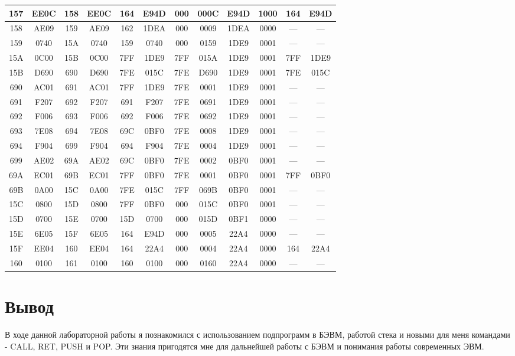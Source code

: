\begin{center}
\begin{tabular}{|c|c|c|c|c|c|c|c|c|c|c|c|}
\hline
157 & EE0C & 158 & EE0C & 164 & E94D & 000 & 000C & E94D & 1000 & 164 & E94D\\
\hline
158 & AE09 & 159 & AE09 & 162 & 1DEA & 000 & 0009 & 1DEA & 0000 & --- & ---\\
\hline
159 & 0740 & 15A & 0740 & 159 & 0740 & 000 & 0159 & 1DE9 & 0001 & --- & ---\\
\hline
15A & 0C00 & 15B & 0C00 & 7FF & 1DE9 & 7FF & 015A & 1DE9 & 0001 & 7FF & 1DE9\\
\hline
15B & D690 & 690 & D690 & 7FE & 015C & 7FE & D690 & 1DE9 & 0001 & 7FE & 015C\\
\hline
690 & AC01 & 691 & AC01 & 7FF & 1DE9 & 7FE & 0001 & 1DE9 & 0001 & --- & ---\\
\hline
691 & F207 & 692 & F207 & 691 & F207 & 7FE & 0691 & 1DE9 & 0001 & --- & ---\\
\hline
692 & F006 & 693 & F006 & 692 & F006 & 7FE & 0692 & 1DE9 & 0001 & --- & ---\\
\hline
693 & 7E08 & 694 & 7E08 & 69C & 0BF0 & 7FE & 0008 & 1DE9 & 0001 & --- & ---\\
\hline
694 & F904 & 699 & F904 & 694 & F904 & 7FE & 0004 & 1DE9 & 0001 & --- & ---\\
\hline
699 & AE02 & 69A & AE02 & 69C & 0BF0 & 7FE & 0002 & 0BF0 & 0001 & --- & ---\\
\hline
69A & EC01 & 69B & EC01 & 7FF & 0BF0 & 7FE & 0001 & 0BF0 & 0001 & 7FF & 0BF0\\
\hline
69B & 0A00 & 15C & 0A00 & 7FE & 015C & 7FF & 069B & 0BF0 & 0001 & --- & ---\\
\hline
15C & 0800 & 15D & 0800 & 7FF & 0BF0 & 000 & 015C & 0BF0 & 0001 & --- & ---\\
\hline
15D & 0700 & 15E & 0700 & 15D & 0700 & 000 & 015D & 0BF1 & 0000 & --- & ---\\
\hline
15E & 6E05 & 15F & 6E05 & 164 & E94D & 000 & 0005 & 22A4 & 0000 & --- & ---\\
\hline
15F & EE04 & 160 & EE04 & 164 & 22A4 & 000 & 0004 & 22A4 & 0000 & 164 & 22A4\\
\hline
160 & 0100 & 161 & 0100 & 160 & 0100 & 000 & 0160 & 22A4 & 0000 & --- & ---\\
\hline
\end{tabular}
\end{center}

\section{Вывод}
В ходе данной лабораторной работы я познакомился с использованием подпрограмм в БЭВМ, работой стека и новыми для меня командами - CALL, RET, PUSH и POP. Эти знания пригодятся мне для дальнейшей работы с БЭВМ и понимания работы современных ЭВМ.
